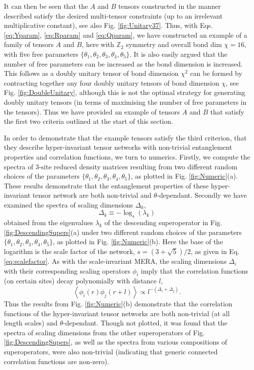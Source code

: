 \documentclass[aps,prl,twocolumn,showpacs,superscriptaddress,floatfix,10pt]{revtex4-1}
\begin{document}
It can then be seen that the $A$ and $B$ tensors constructed in the manner described satisfy the desired multi-tensor constraints (up to an irrelevant multiplicative constant), see also Fig. \ref{fig:Unitary37}. Thus, with Eqs. \ref{eq:Yparam}, \ref{eq:Rparam} and \ref{eq:Qparam}, we have constructed an example of a family of tensors $A$ and $B$, here with $\mathbb{Z}_2$ symmetry and overall bond dim $\chi = 16$, with five free parameters $\{\theta_1,\theta_2,\theta_3,\theta_4,\theta_5 \}$. It is also easily argued that the number of free parameters can be increased as the bond dimension is increased. This follows as a doubly unitary tensor of bond dimension $\chi^2$ can be formed by contracting together any four doubly unitary tensors of bond dimension $\chi$, see Fig. \ref{fig:DoubleUnitary}, although this is not the optimal strategy for generating doubly unitary tensors (in terms of maximising the number of free parameters in the tensors). Thus we have provided an example of tensors $A$ and $B$ that satisfy the first two criteria outlined at the start of this section.

In order to demonstrate that the example tensors satisfy the third criterion, that they describe hyper-invariant tensor networks with non-trivial entanglement properties and correlation functions, we turn to numerics. Firstly, we compute the spectra of 3-site reduced density matrices resulting from two different random choices of the parameters $\{\theta_1,\theta_2,\theta_3,\theta_4,\theta_5 \}$, as plotted in Fig. \ref{fig:Numeric}(a). These results demonstrate that the entanglement properties of these hyper-invariant tensor network are both non-trivial and $\theta$-dependant. Secondly we have examined the spectra of scaling dimensions $\Delta_k$,
\begin{equation}
\Delta_k \equiv -\log_s (\lambda_k) \label{eq:scaling}
\end{equation}
obtained from the eigenvalues $\lambda_k$ of the descending superoperator in Fig. \ref{fig:DescendingSupers}(a) under two different random choices of the parameters $\{\theta_1,\theta_2,\theta_3,\theta_4,\theta_5 \}$, as plotted in Fig. \ref{fig:Numeric}(b). Here the base of the logarithm is the scale factor of the network, $s=(3+\sqrt{5})/2$, as given in Eq. \ref{eq:scalefactor}. As with the scale-invariant MERA, the scaling dimensions $\Delta_i$ with their corresponding scaling operators $\phi_i$ imply that the correlation functions (on certain sites) decay polynomially with distance $l$,  
\begin{equation}
\left\langle {{\phi_i(r)}{\phi_j(r + l)}} \right\rangle  \propto {l^{ - (\Delta_i + \Delta_j) }}.
\end{equation}
Thus the results from Fig. \ref{fig:Numeric}(b) demonstrate that the correlation functions of the hyper-invariant tensor networks are both non-trivial (at all length scales) and $\theta$-dependant. Though not plotted, it was found that the spectra of scaling dimensions from the other superoperators of Fig. \ref{fig:DescendingSupers}, as well as the spectra from various  compositions of superoperators, were also non-trivial (indicating that generic connected correlation functions are non-zero).
\end{document}
